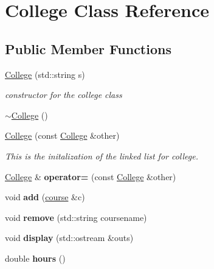\hypertarget{classCollege}{}\section{College Class Reference}
\label{classCollege}
\subsection*{Public Member Functions}
\begin{DoxyCompactItemize}
\item 
\hyperlink{classCollege_adabaf4087355e83f9f7d39f1e1498b41}{College} (std\+::string s)
\begin{DoxyCompactList}\small\item\em constructor for the college class \end{DoxyCompactList}\item 
\hyperlink{classCollege_a42fcce4f87439592eaefd96564a796a8}{$\sim$\+College} ()
\item 
\hyperlink{classCollege_ad007ad488e5a7ef986114080d0c8e101}{College} (const \hyperlink{classCollege}{College} \&other)
\begin{DoxyCompactList}\small\item\em This is the initalization of the linked list for college. \end{DoxyCompactList}\item 
\hyperlink{classCollege}{College} \& {\bfseries operator=} (const \hyperlink{classCollege}{College} \&other)\hypertarget{classCollege_af2194c9b37f80d13dc3fdba6784b18e8}{}\label{classCollege_af2194c9b37f80d13dc3fdba6784b18e8}

\item 
void {\bfseries add} (\hyperlink{classcourse}{course} \&c)\hypertarget{classCollege_a67fd1d8970b46b24ce2e0dd72598a22f}{}\label{classCollege_a67fd1d8970b46b24ce2e0dd72598a22f}

\item 
void {\bfseries remove} (std\+::string coursename)\hypertarget{classCollege_a4d2ae513b36e6421fb1ca2c08459cfe6}{}\label{classCollege_a4d2ae513b36e6421fb1ca2c08459cfe6}

\item 
void {\bfseries display} (std\+::ostream \&outs)\hypertarget{classCollege_a52ca0a164483cf5c05591cd0fb8b300c}{}\label{classCollege_a52ca0a164483cf5c05591cd0fb8b300c}

\item 
double {\bfseries hours} ()\hypertarget{classCollege_a8a7a762611a1d7e00c453390d49355fd}{}\label{classCollege_a8a7a762611a1d7e00c453390d49355fd}


\end{DoxyCompactItemize}
